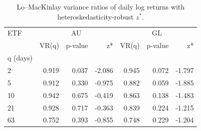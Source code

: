 \begin{table}
\caption{Lo--MacKinlay variance ratios of daily log returns with heteroskedasticity-robust $z^*$.}
\label{tab:vr}
\begin{tabular}{lrrrrrr}
\toprule
ETF & \multicolumn{3}{c}{AU} & \multicolumn{3}{c}{GL} \\
 & VR(q) & p-value & z* & VR(q) & p-value & z* \\
q (days) &  &  &  &  &  &  \\
\midrule
2 & 0.919 & 0.037 & -2.086 & 0.945 & 0.072 & -1.797 \\
5 & 0.912 & 0.330 & -0.975 & 0.882 & 0.059 & -1.885 \\
10 & 0.942 & 0.675 & -0.419 & 0.863 & 0.138 & -1.483 \\
21 & 0.928 & 0.717 & -0.363 & 0.839 & 0.224 & -1.215 \\
63 & 0.752 & 0.393 & -0.855 & 0.748 & 0.229 & -1.204 \\
\bottomrule
\end{tabular}
\end{table}
